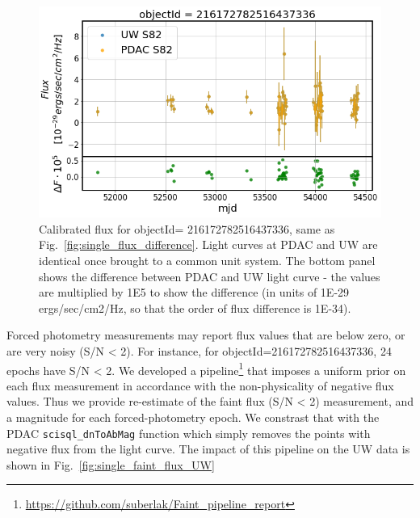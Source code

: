 \documentclass[DM,lsstdraft,toc]{lsstdoc}
\begin{document}
\begin{figure}
\includegraphics[width=\textwidth]{figs/Single_raw_LC_comparison}
\caption{Calibrated flux for objectId= 216172782516437336, same as Fig.~\ref{fig:single_flux_difference}. Light curves at PDAC and UW are identical once brought to a common unit system.  The bottom panel shows the difference between PDAC and UW light curve - the values are multiplied by 1E5 to show the difference (in units of 1E-29 ergs/sec/cm2/Hz, so that the order of flux difference is 1E-34). }
\label{fig:single_calib_flux}
\end{figure}



Forced photometry measurements may report flux values that are below zero, or are very noisy (S/N < 2). For instance, for objectId=216172782516437336, 24 epochs have S/N < 2.  We developed a pipeline\footnote{\url{https://github.com/suberlak/Faint_pipeline_report}} that imposes a uniform prior on each flux measurement in accordance with the non-physicality of negative flux values.  Thus we provide re-estimate of the faint flux (S/N < 2) measurement, and a magnitude for each forced-photometry epoch.  We constrast that with the PDAC \verb|scisql_dnToAbMag| function which simply removes the points with negative flux from the light curve. The impact of this pipeline on the UW data is shown in Fig.~\ref{fig:single_faint_flux_UW}
\end{document}
